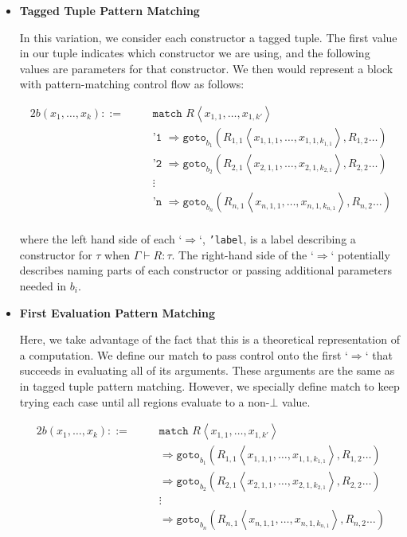 \documentclass{article}
\begin{document}
\begin{itemize}
  \item \textbf{Tagged Tuple Pattern Matching}

In this variation, we consider each constructor a tagged tuple. The first value in our tuple indicates which constructor we are using, and the following values are parameters for that constructor. We then would represent a block with pattern-matching control flow as follows:

\begin{alignat*}{2}
b(x_1, \dots, x_k) ::=&\, &&\texttt{match } R \left\langle x_{1,1}, \dots, x_{1,k'} \right\rangle \\
    & &&\texttt{'1 } \Rightarrow \texttt{goto}_{b_1} \left( R_{1,1} \left\langle x_{1,1,1}, \dots, x_{1,1,k_{1,1}} \right\rangle, R_{1,2} \dots\right) \\
    & &&\texttt{'2 } \Rightarrow \texttt{goto}_{b_2} \left( R_{2,1} \left\langle x_{2,1,1}, \dots, x_{2,1,k_{2,1}} \right\rangle, R_{2,2} \dots\right) \\
    & &&\vdots \\
    & &&\texttt{'n } \Rightarrow \texttt{goto}_{b_n} \left( R_{n,1} \left\langle x_{n,1,1}, \dots, x_{n,1,k_{n,1}} \right\rangle, R_{n,2} \dots\right) \\
\end{alignat*}

where the left hand side of each `$\Rightarrow$`, \texttt{'label}, is a label describing a constructor for $\tau$ when $\Gamma \vdash R : \tau$. The right-hand side of the `$\Rightarrow$` potentially describes naming parts of each constructor or passing additional parameters needed in $b_i$.

\item \textbf{First Evaluation Pattern Matching}

Here, we take advantage of the fact that this is a theoretical representation of a computation. We define our match to pass control onto the first `$\Rightarrow$` that succeeds in evaluating all of its arguments. These arguments are the same as in tagged tuple pattern matching. However, we specially define match to keep trying each case until all regions evaluate to a non-$\bot$ value.

\begin{alignat*}{2}
b(x_1, \dots, x_k) ::=&\, &&\texttt{match } R \left\langle x_{1,1}, \dots, x_{1,k'} \right\rangle \\
    & && \Rightarrow \texttt{goto}_{b_1} \left( R_{1,1} \left\langle x_{1,1,1}, \dots, x_{1,1,k_{1,1}} \right\rangle, R_{1,2} \dots\right) \\
    & &&  \Rightarrow \texttt{goto}_{b_2} \left( R_{2,1} \left\langle x_{2,1,1}, \dots, x_{2,1,k_{2,1}} \right\rangle, R_{2,2} \dots\right) \\
    & && \vdots \\
    & && \Rightarrow \texttt{goto}_{b_n} \left( R_{n,1} \left\langle x_{n,1,1}, \dots, x_{n,1,k_{n,1}} \right\rangle, R_{n,2} \dots\right) \\
\end{alignat*}


\end{itemize}
\end{document}
